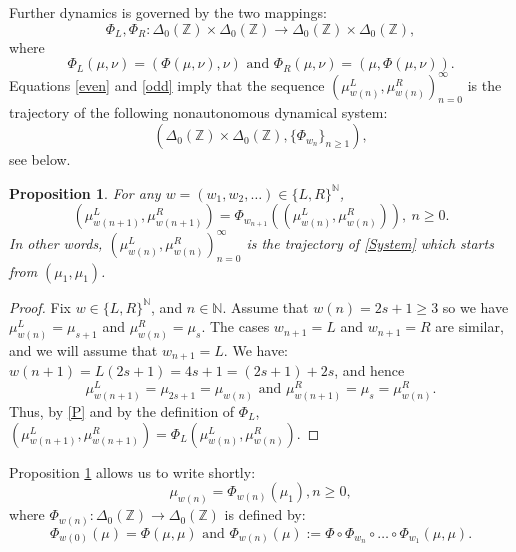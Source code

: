 \documentclass[10pt]{amsart}
\newtheorem{proposition}[theorem]{Proposition}
\theoremstyle{definition}
\numberwithin{equation}{section}
\newcommand{\N}{\mathbb{N}}
\newcommand{\Z}{\mathbb{Z}}
\begin{document}
Further dynamics is governed by the two mappings: 
$$\Phi_L, \Phi_R\colon \Delta_0(\Z)\times \Delta_0(\Z) \to \Delta_0(\Z)\times \Delta_0(\Z),$$ where
$$\Phi_L(\mu,\nu)=(\Phi(\mu,\nu),\nu)\mbox{ and }\Phi_R(\mu,\nu)=(\mu,\Phi(\mu,\nu)).$$
Equations \eqref{even} and \eqref{odd} imply that the sequence  $(\mu^L_{w(n)},\mu^R_{w(n)})_{n=0}^{\infty}$ is the trajectory of the following nonautonomous dynamical system:
\begin{equation}\label{System}
(\Delta_0(\Z)\times \Delta_0(\Z), \{\Phi_{w_n}\}_{n\geq1}),
\end{equation}
see below.
\begin{proposition}\label{TT}
For any $w=(w_1,w_2,\dots)\in\{L,R\}^\N$,
 $$(\mu^L_{w(n+1)},\mu^R_{w(n+1)})=\Phi_{w_{n+1}}\left((\mu^L_{w(n)},\mu^R_{w(n)})\right),\ n\geq 0.$$
 In other words,  $(\mu^L_{w(n)},\mu^R_{w(n)})_{n=0}^{\infty}$ is the trajectory of \eqref{System} which starts from $(\mu_1,\mu_1)$. 
\end{proposition}

\begin{proof}
Fix $w\in\{L,R\}^\N$, and $n\in\N$. Assume that $w(n)=2s+1\geq 3$ so we have $\mu^L_{w(n)}=\mu_{s+1}$ and $\mu^R_{w(n)}=\mu_{s}$. %
The cases $w_{n+1}=L$ and $w_{n+1}=R$ are similar, and we will  assume that $w_{n+1}=L$. We have:  $w(n+1)=L(2s+1)=4s+1=(2s+1)+2s$, and hence 
$$\mu_{w(n+1)}^L=\mu_{2s+1}=\mu_{w(n)}\mbox{ and }\mu_{w(n+1)}^R=\mu_s=\mu_{w(n)}^R.$$
 Thus, by \eqref{P} and by the definition of $\Phi_L$, $(\mu_{w(n+1)}^L,\mu_{w(n+1)}^R)=\Phi_L(\mu_{w(n)}^L,\mu_{w(n)}^R).$
\end{proof}

Proposition \ref{TT} allows us to write shortly:
$$\mu_{w(n)}=\Phi_{w(n)}(\mu_1), n\geq 0,$$
where  $\Phi_{w(n)}\colon \Delta_0(\Z)\to \Delta_0(\Z)$ is defined by:
$$\Phi_{w(0)}(\mu)=\Phi(\mu,\mu)\mbox{ and }   \Phi_{w(n)}(\mu):=\Phi\circ\Phi_{w_n}\circ\dots\circ\Phi_{w_1}(\mu,\mu).$$
\end{document}
